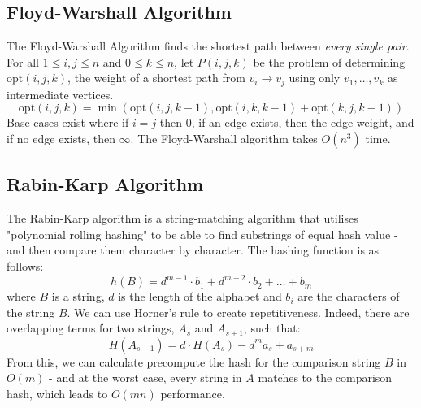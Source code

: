 \documentclass[journal, letterpaper]{IEEEtran}
\begin{document}
  \subsection{Floyd-Warshall Algorithm}
  The Floyd-Warshall Algorithm finds the shortest path between \emph{every single pair}.\\ For all $1 \le i, j \le n$ and $0 \le k \le n$,
  let $P(i, j, k)$ be the problem of determining $\text{opt}(i, j, k)$, the weight of a shortest path from $v_i \to v_j$ using only
  $v_1, \ldots, v_k$ as intermediate vertices. 
  \[ \text{opt}(i, j, k) = \min(\text{opt}(i, j, k - 1), \text{opt}(i, k, k - 1) + \text{opt}(k, j, k - 1))\]
  Base cases exist where if $i = j$ then $0$, if an edge exists, then the edge weight, and if no edge exists, then $\infty$. The
  Floyd-Warshall algorithm takes $O(n^3)$ time.
  \pagebreak 
  \subsection{Rabin-Karp Algorithm}
  The Rabin-Karp algorithm is a string-matching algorithm that utilises "polynomial rolling hashing" to be able to find
  substrings of equal hash value - and then compare them character by character. The hashing function is as follows:
  \[ h(B) = d^{m - 1} \cdot b_1 + d^{m-2} \cdot b_2 + \ldots + b_m\]
  where $B$ is a string, $d$ is the length of the alphabet and $b_i$ are the characters of the string $B$. We can use Horner's
  rule to create repetitiveness. Indeed, there are overlapping terms for two strings, $A_{s}$ and
  $A_{s + 1}$, such that:
  \[ H(A_{s + 1}) = d \cdot H(A_s) - d^m a_s + a_{s + m}\]
  From this, we can calculate precompute the hash for the comparison string $B$ in $O(m)$ - and at the worst case,
  every string in $A$ matches to the comparison hash, which leads to $O(mn)$ performance.
\end{document}

